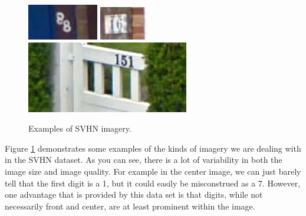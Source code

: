 \documentclass[12pt]{article}
\begin{document}
\begin{figure}[!htb]
	\includegraphics[width=\linewidth]{1046.png}
\endminipage\hfill
{}
	\includegraphics[width=\linewidth]{10.png}
\endminipage\hfill
{}
	\includegraphics[width=\linewidth]{20.png}
\endminipage\hfill
\caption{Examples of SVHN imagery.}
\label{fig:example_imagery}
\end{figure}

Figure \ref{fig:example_imagery} demonstrates some examples of the kinds of imagery we are dealing with in the SVHN dataset. 
As you can see, there is a lot of variability in both the image size and image quality. 
For example in the center image, we can just barely tell that the first digit is a 1, but it could easily be misconstrued as a 7. 
However, one advantage that is provided by this data set is that digits, while not necessarily front and center, are at least prominent within the image.
\end{document}
